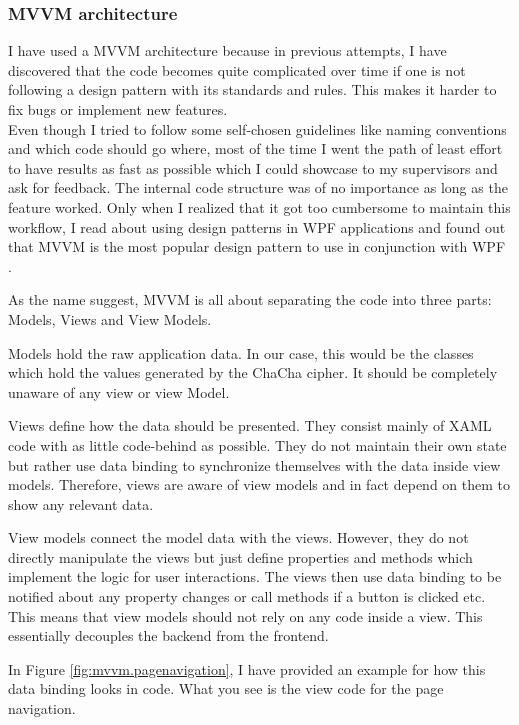 \subsubsection{MVVM architecture}

I have used a MVVM architecture because in previous attempts, I have discovered that the code becomes quite complicated over time if one is not following a design pattern with its standards and rules. This makes it harder to fix bugs or implement new features. \\
Even though I tried to follow some self-chosen guidelines like naming conventions and which code should go where, most of the time I went the path of least effort to have results as fast as possible which I could showcase to my supervisors and ask for feedback. The internal code structure was of no importance as long as the feature worked. Only when I realized that it got too cumbersome to maintain this workflow, I read about using design patterns in WPF applications and found out that MVVM is the most popular design pattern to use in conjunction with WPF \cite{mvvm-wpf}.

As the name suggest, MVVM is all about separating the code into three parts: Models, Views and View Models.

Models hold the raw application data. In our case, this would be the classes which hold the values generated by the ChaCha cipher. It should be completely unaware of any view or view Model.

Views define how the data should be presented. They consist mainly of XAML code with as little code-behind as possible. They do not maintain their own state but rather use data binding to synchronize themselves with the data inside view models. Therefore, views are aware of view models and in fact depend on them to show any relevant data.

View models connect the model data with the views. However, they do not directly manipulate the views but just define properties and methods which implement the logic for user interactions. The views then use data binding to be notified about any property changes or call methods if a button is clicked etc. This means that view models should not rely on any code inside a view. This essentially decouples the backend from the frontend.

In Figure \ref{fig:mvvm.pagenavigation}, I have provided an example for how this data binding looks in code. What you see is the view code for the page navigation.

